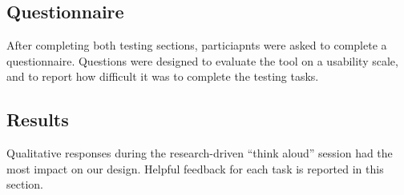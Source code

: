 \documentclass{sigchi}
\begin{document}
\subsection{Questionnaire}
After completing both testing sections, particiapnts were asked to complete a questionnaire. Questions were designed to evaluate the tool on a usability scale, and to report how difficult it was to complete the testing tasks.

\subsection{Results}

Qualitative responses during the research-driven ``think aloud'' session had the most impact on our design. Helpful feedback for each task is reported in this section.
\end{document}
